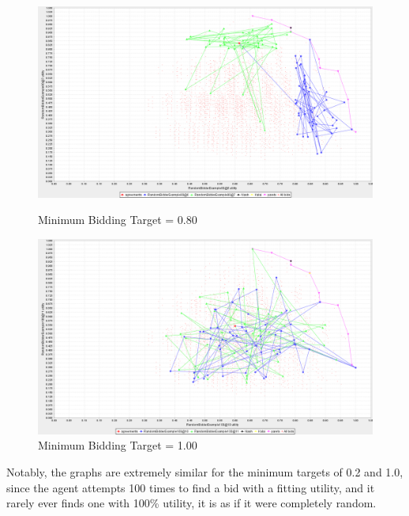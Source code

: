 \documentclass{article}
\begin{document}
\begin{enumerate}[label=(\alph*)]
\begin{figure}[ht]
  \includegraphics[width=\linewidth]{imgs/rb_80}
  \caption{Minimum Bidding Target = 0.80}
  \endminipage\hfill
  \includegraphics[width=\linewidth]{imgs/rb_100}
  \caption{Minimum Bidding Target = 1.00}
  \endminipage\hfill
\end{figure}

Notably, the graphs are extremely similar for the minimum targets of 0.2 and 1.0, since the agent attempts 100 times to find a bid with a fitting utility, and it rarely ever finds one with 100\% utility, it is as if it were completely random.


\end{enumerate}
\end{document}
